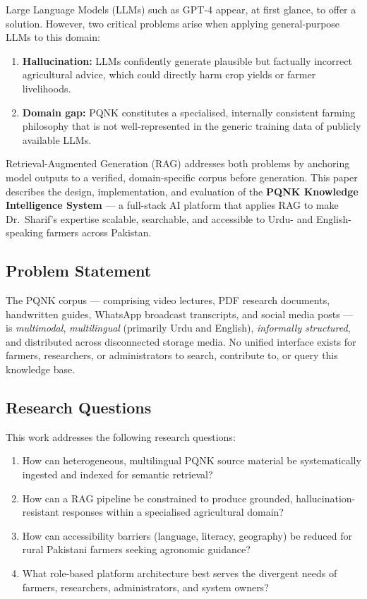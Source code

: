 \documentclass[12pt, a4paper]{article}
\begin{document}
\begin{onehalfspacing}
Large Language Models (LLMs) such as GPT-4 appear, at first glance, to offer a
solution. However, two critical problems arise when applying general-purpose LLMs
to this domain:
\begin{enumerate}[noitemsep]
  \item \textbf{Hallucination:} LLMs confidently generate plausible but factually
    incorrect agricultural advice, which could directly harm crop yields or farmer
    livelihoods.
  \item \textbf{Domain gap:} PQNK constitutes a specialised, internally consistent
    farming philosophy that is not well-represented in the generic training data
    of publicly available LLMs.
\end{enumerate}

Retrieval-Augmented Generation (RAG) addresses both problems by anchoring model
outputs to a verified, domain-specific corpus before generation. This paper
describes the design, implementation, and evaluation of the
\textbf{PQNK Knowledge Intelligence System} --- a full-stack AI platform that
applies RAG to make Dr.~Sharif's expertise scalable, searchable, and accessible
to Urdu- and English-speaking farmers across Pakistan.

\subsection{Problem Statement}

The PQNK corpus --- comprising video lectures, PDF research documents, handwritten
guides, WhatsApp broadcast transcripts, and social media posts --- is
\textit{multimodal}, \textit{multilingual} (primarily Urdu and English),
\textit{informally structured}, and distributed across disconnected storage media.
No unified interface exists for farmers, researchers, or administrators to search,
contribute to, or query this knowledge base.

\subsection{Research Questions}

This work addresses the following research questions:
\begin{enumerate}[noitemsep]
  \item How can heterogeneous, multilingual PQNK source material be systematically
    ingested and indexed for semantic retrieval?
  \item How can a RAG pipeline be constrained to produce grounded,
    hallucination-resistant responses within a specialised agricultural domain?
  \item How can accessibility barriers (language, literacy, geography) be reduced
    for rural Pakistani farmers seeking agronomic guidance?
  \item What role-based platform architecture best serves the divergent needs
    of farmers, researchers, administrators, and system owners?
\end{enumerate}



\end{onehalfspacing}
\end{document}
